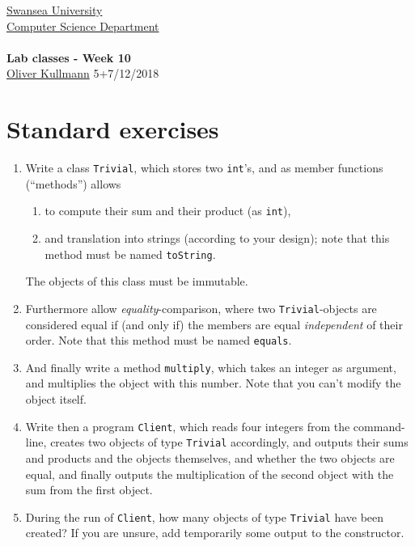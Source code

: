 \documentclass[11pt]{article}
\newcommand{\Java}{\lstset{language=Java,keywordstyle=\bfseries,breaklines,breakindent=30pt}}
\begin{document}
\begin{center}
  \href{http://www.swan.ac.uk/}{Swansea University}\\
  \href{http://www.swan.ac.uk/compsci/}{Computer Science Department}\\[1ex]
  \href{\chp}{\module}\\[1ex]
  \textbf{Lab classes - Week 10}\\
  \href{http://cs.swan.ac.uk/~csoliver}{Oliver Kullmann} 5+7/12/2018
\end{center}


\section{Standard exercises}
\label{sec:stdex}

\Java

\begin{enumerate}
\item Write a class \texttt{Trivial}, which stores two \texttt{int}'s, and as member functions (``methods'') allows
  \begin{enumerate}
  \item to compute their sum and their product (as \texttt{int}),
  \item and translation into strings (according to your design); note that this method must be named \texttt{toString}.
  \end{enumerate}
 The objects of this class must be immutable.
\item Furthermore allow \emph{equality}-comparison, where two \texttt{Trivial}-objects are considered equal if (and only if) the members are equal \emph{independent} of their order. Note that this method must be named \texttt{equals}.
\item And finally write a method \texttt{multiply}, which takes an integer as argument, and multiplies the object with this number. Note that you can't modify the object itself.
\item Write then a program \texttt{Client}, which reads four integers from the command-line, creates two objects of type \texttt{Trivial} accordingly, and outputs their sums and products and the objects themselves, and whether the two objects are equal, and finally outputs the multiplication of the second object with the sum from the first object.
\item During the run of \texttt{Client}, how many objects of type \texttt{Trivial} have been created? If you are unsure, add temporarily some output to the constructor.
\end{enumerate}
\end{document}
